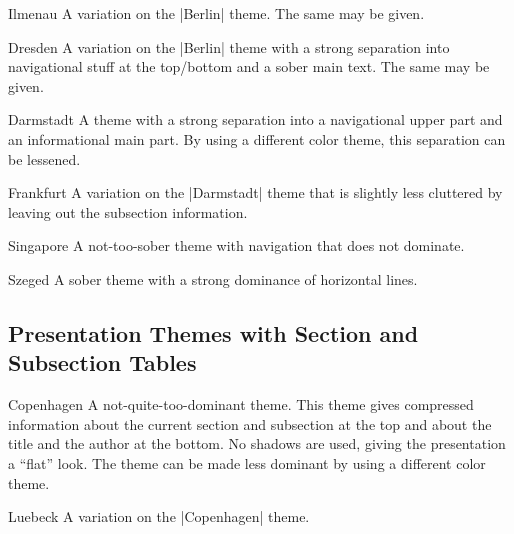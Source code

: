 \begin{themeexample}{Ilmenau}
  A variation on the |Berlin| theme. The same  may be
  given.  
\end{themeexample}

\begin{themeexample}{Dresden}
  A variation on the |Berlin| theme with a strong separation into
  navigational stuff at the top/bottom and a sober main text. The same
   may be given.  
\end{themeexample}


\begin{themeexample}{Darmstadt}
  A theme with a strong separation into a navigational upper part and
  an informational main part. By using a different color theme, this
  separation can be lessened. 
\end{themeexample}

\begin{themeexample}{Frankfurt}
  A variation on the |Darmstadt| theme that is slightly less cluttered
  by leaving out the subsection information.
\end{themeexample}

\begin{themeexample}{Singapore}
  A not-too-sober theme with navigation that does not dominate.
\end{themeexample}

\begin{themeexample}{Szeged}
  A sober theme with a strong dominance of horizontal lines. 
\end{themeexample}




\subsection{Presentation Themes with Section and Subsection Tables}

\begin{themeexample}{Copenhagen}
  A not-quite-too-dominant theme. This theme gives compressed
  information about the current section and subsection at the top and
  about the title and the author at the bottom. No shadows are used,
  giving the presentation a ``flat'' look. The theme can be made less
  dominant by using a different color theme.
\end{themeexample}


\begin{themeexample}{Luebeck}
  A variation on the |Copenhagen| theme.
\end{themeexample}

